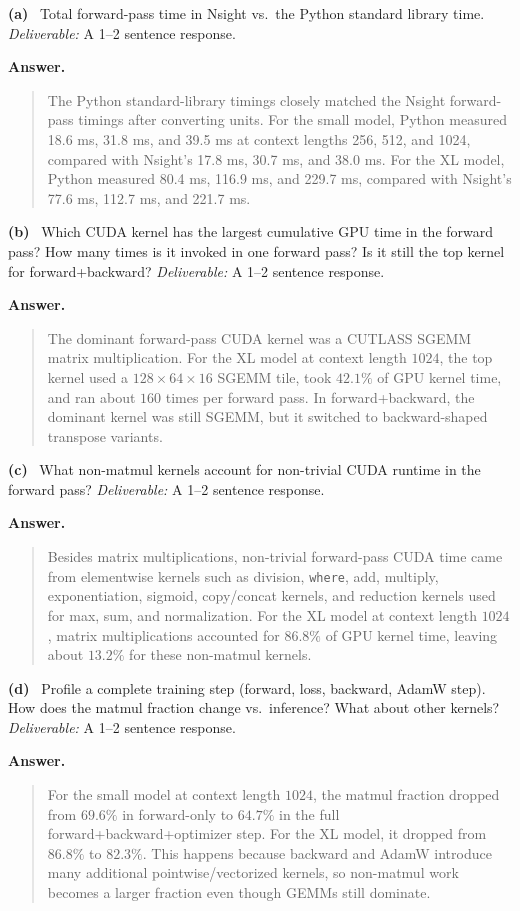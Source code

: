 \documentclass[11pt]{article}
\newcommand{\subq}[1]{\vspace{0.3em}\noindent\textbf{(#1)}\ }
\newcommand{\deliverable}[1]{\vspace{0.2em}\noindent\textit{Deliverable:} #1\par}
\newenvironment{answer}{%
  \vspace{0.3em}%
  \noindent\textbf{Answer.}\begin{quote}%
}{%
  \end{quote}\vspace{0.4em}%
}
\begin{document}
\subq{a} Total forward-pass time in Nsight vs.\ the Python standard library time.
\deliverable{A 1--2 sentence response.}
\begin{answer}
  The Python standard-library timings closely matched the Nsight forward-pass timings 
  after converting units. For the small model, Python measured 18.6 ms, 31.8 ms, and 
  39.5 ms at context lengths 256, 512, and 1024, compared with Nsight's 17.8 ms, 30.7 ms, 
  and 38.0 ms. For the XL model, Python measured 80.4 ms, 116.9 ms, and 229.7 ms, compared 
  with Nsight's 77.6 ms, 112.7 ms, and 221.7 ms.
\end{answer}

\subq{b} Which CUDA kernel has the largest cumulative GPU time in the forward pass? How many times is it invoked in one forward pass? Is it still the top kernel for forward+backward?
\deliverable{A 1--2 sentence response.}
\begin{answer}
The dominant forward-pass CUDA kernel was a CUTLASS SGEMM matrix multiplication.
For the XL model at context length $1024$, the top kernel used a $128\times64\times16$ SGEMM tile, took $42.1\%$ of GPU kernel time, and ran about $160$ times per forward pass.
In forward+backward, the dominant kernel was still SGEMM, but it switched to backward-shaped transpose variants.
\end{answer}

\subq{c} What non-matmul kernels account for non-trivial CUDA runtime in the forward pass?
\deliverable{A 1--2 sentence response.}
\begin{answer}
Besides matrix multiplications, non-trivial forward-pass CUDA time came from elementwise kernels such as division, \texttt{where}, add, multiply, exponentiation, sigmoid, copy/concat kernels, and reduction kernels used for max, sum, and normalization.
For the XL model at context length $1024$, matrix multiplications accounted for $86.8\%$ of GPU kernel time, leaving about $13.2\%$ for these non-matmul kernels.
\end{answer}

\subq{d} Profile a complete training step (forward, loss, backward, AdamW step). How does the matmul fraction change vs.\ inference? What about other kernels?
\deliverable{A 1--2 sentence response.}
\begin{answer}
For the small model at context length $1024$, the matmul fraction dropped from $69.6\%$ in forward-only to $64.7\%$ in the full forward+backward+optimizer step.
For the XL model, it dropped from $86.8\%$ to $82.3\%$. This happens because backward and AdamW introduce many additional pointwise/vectorized kernels, so non-matmul work becomes a larger fraction even though GEMMs still dominate.
\end{answer}
\end{document}

